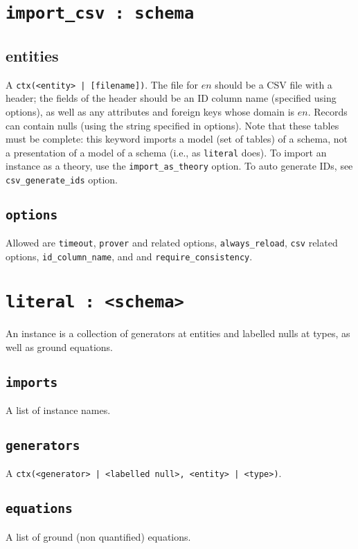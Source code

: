 \documentclass[10pt]{book}
\begin{document}
\section{{\tt import\_csv : schema}}
\subsection{entities}
A {\tt ctx(<entity> | [filename])}.  The file for $en$ should be a CSV file with a header; the fields of the header should be an ID column name (specified using options), as well as any attributes and foreign keys whose domain is $en$.  Records can contain nulls (using the string specified in options).  Note that these tables must be complete: this keyword imports a model (set of tables) of a schema, not a presentation of a model of a schema (i.e., as {\tt literal} does).  To import an instance as a theory, use the {\tt import\_as\_theory} option.  To auto generate IDs, see {\tt csv\_generate\_ids} option.


\subsection{{\tt options}}
Allowed are {\tt timeout}, {\tt prover} and related options, {\tt always\_reload}, {\tt csv} related options, {\tt id\_column\_name}, and and {\tt require\_consistency}. 


\section{{\tt literal : <schema>}}

An instance is a collection of generators at entities and labelled nulls at types, as well as ground equations.

\subsection{{\tt imports}}
A list of instance names.

\subsection{{\tt generators}}
A {\tt ctx(<generator> | <labelled null>, <entity> | <type>)}.

\subsection{{\tt equations}}
A list of ground (non quantified) equations.
\end{document}
